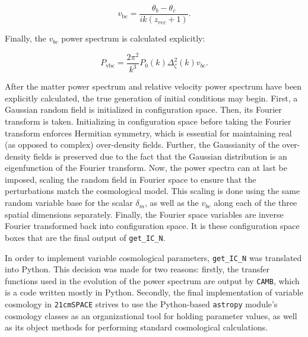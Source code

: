 \documentclass[floats,floatfix,showpacs,amssymb,prd,superscriptaddress,nofootinbib]{revtex4-2} %
\newcommand{\code}{\texttt}
\newcommand{\red}{\textcolor{red}}
\begin{document}
\begin{equation}
    v_\text{bc} = \frac{\theta_b - \theta_c}{i k (z_{rec} + 1)}.
\end{equation}

Finally, the $v_{bc}$ power spectrum is calculated explicitly:

\begin{equation}
    P_{\text{vbc}} = \frac{2 \pi^2}{k^3} P_0 (k) \Delta_\zeta ^2 (k)v_{bc}.
\end{equation}

After the matter power spectrum and relative velocity power spectrum have been explicitly calculated, the true generation of initial conditions may begin. First, a Gaussian random field is initialized in configuration space. Then, its Fourier transform is taken. Initializing in configuration space before taking the Fourier transform enforces Hermitian symmetry, which is essential for maintaining real (as opposed to complex) over-density fields. Further, the Gaussianity of the over-density fields is preserved due to the fact that the Gaussian distribution is an eigenfunction of the Fourier transform. Now, the power spectra can at last be imposed, scaling the random field in Fourier space to ensure that the perturbations match the cosmological model. This scaling is done using the same random variable base for the scalar $\delta_m$, as well as the $v_{bc}$ along each of the three spatial dimensions separately. Finally, the Fourier space variables are inverse Fourier transformed back into configuration space. It is these configuration space boxes that are the final output of \code{get\_IC\_N}.


In order to implement variable cosmological parameters, \code{get\_IC\_N} was translated into Python. This decision was made for two reasons: firstly, the transfer functions used in the evolution of the power spectrum are output by \code{CAMB}, which is a code written mostly in Python. Secondly, the final implementation of variable cosmology in \code{21cmSPACE} strives to use the Python-based \code{astropy} module's cosmology classes as an organizational tool for holding parameter values, as well as its object methods for performing standard cosmological calculations. %
\end{document}
